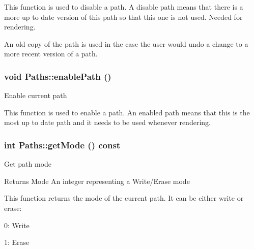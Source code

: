 This function is used to disable a path. A disable path means that there is a more up to date version of this path so that this one is not used. Needed for rendering.

An old copy of the path is used in the case the user would undo a change to a more recent version of a path. \hypertarget{classPaths_a2d96d9d2e548e20f99b02e515e1ae0a9}{
\subsubsection[{enablePath}]{\setlength{\rightskip}{0pt plus 5cm}void Paths::enablePath ()}}
\label{classPaths_a2d96d9d2e548e20f99b02e515e1ae0a9}
Enable current path

This function is used to enable a path. An enabled path means that this is the most up to date path and it needs to be used whenever rendering. \hypertarget{classPaths_a42cd16bc8b70319cf6d4477c518c6bf3}{
\subsubsection[{getMode}]{\setlength{\rightskip}{0pt plus 5cm}int Paths::getMode () const}}
\label{classPaths_a42cd16bc8b70319cf6d4477c518c6bf3}
Get path mode \begin{DoxyReturn}{Returns}
Mode An integer representing a Write/Erase mode
\end{DoxyReturn}
This function returns the mode of the current path. It can be either write or erase:
\begin{DoxyItemize}
\item 0: Write
\item 1: Erase
\end{DoxyItemize}

